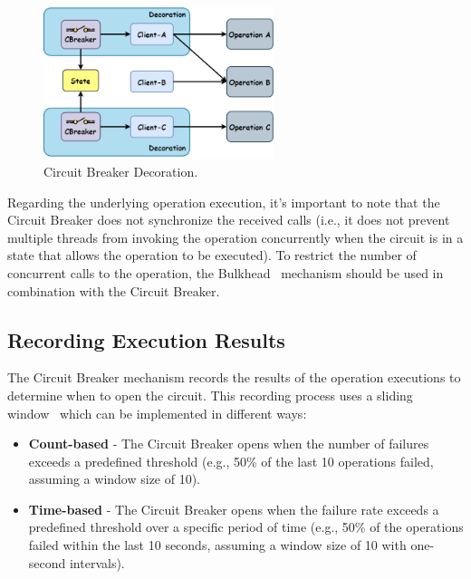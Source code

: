 \begin{figure}[!htb]
    \centering
    \includegraphics[width=0.6\textwidth]{../figures/05_cbreaker-decoration}
    \caption{Circuit Breaker Decoration.}
    \label{fig:cbreaker-decoration}
\end{figure}

Regarding the underlying operation execution,
it's important to note that the Circuit Breaker does not synchronize the received calls (i.e., it does not prevent multiple threads from invoking the operation concurrently when the circuit is in a state that allows the operation to be executed).
To restrict the number of concurrent calls to the operation, the Bulkhead~\cite{microsoft-bulkhead-pattern} mechanism should be used in combination with the Circuit Breaker.

\subsection{Recording Execution Results}\label{subsec:cbreaker-recording-execution-results}

The Circuit Breaker mechanism records the results of the operation executions to determine when to open the circuit.
This recording process uses a sliding window~\cite{sliding-window} which can be implemented in different ways:

\begin{itemize}
    \item \textbf{Count-based} -
    The Circuit Breaker opens when the number of failures exceeds a predefined threshold
    (e.g., 50\% of the last 10 operations failed, assuming a window size of 10).
    \item \textbf{Time-based} -
    The Circuit Breaker opens when the failure rate exceeds a predefined threshold over a specific period of time
    (e.g., 50\% of the operations failed within the last 10 seconds,
    assuming a window size of 10 with one-second intervals).
\end{itemize}

